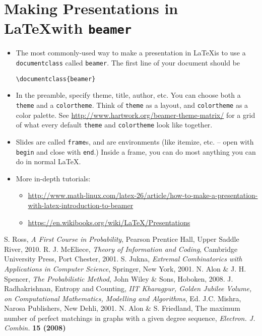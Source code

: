 \documentclass{article}
\begin{document}
	\section{Making Presentations in \LaTeX with \texttt{beamer}}
	\begin{itemize}
		\item The most commonly-used way to make a presentation in \LaTeX is to use a \texttt{documentclass} called \texttt{beamer}. The first line of your document should be
		\begin{verbatim}
\documentclass{beamer}
		\end{verbatim}
		\item In the preamble, specify theme, title, author, etc. You can choose both a \texttt{theme} and a \texttt{colortheme}. Think of \texttt{theme} as a layout, and \texttt{colortheme} as a color palette. See \href{http://www.hartwork.org/beamer-theme-matrix/}{http://www.hartwork.org/beamer-theme-matrix/} for a grid of what every default \texttt{theme} and \texttt{colortheme} look like together.
		\item Slides are called \texttt{frame}s, and are environments (like itemize, etc. -- open with \texttt{begin} and close with \texttt{end}.) Inside a frame, you can do most anything you can do in normal \LaTeX.
		\item More in-depth tutorials:
		\begin{itemize}
			\item \href{http://www.math-linux.com/latex-26/article/how-to-make-a-presentation-with-latex-introduction-to-beamer}{http://www.math-linux.com/latex-26/article/how-to-make-a-presentation-with-latex-introduction-to-beamer}
			\item \href{https://en.wikibooks.org/wiki/LaTeX/Presentations}{https://en.wikibooks.org/wiki/LaTeX/Presentations}
		\end{itemize}
	\end{itemize}
	
\begin{thebibliography}{99}
S. Ross, \textit{A First Course in Probability}, Pearson Prentice Hall, Upper Saddle River, 2010.
R. J. McEliece, \textit{Theory of Information and Coding}, Cambridge University Press, Port Chester, 2001.
S. Jukna, \textit{Extremal Combinatorics with Applications in Computer Science}, Springer, New York, 2001.
N. Alon \& J. H. Spencer, \textit{The Probabilistic Method}, John Wiley \& Sons, Hoboken, 2008.
J. Radhakrishnan, Entropy and Counting, \textit{IIT Kharagpur, Golden Jubilee Volume, on Computational Mathematics, Modelling and Algorithms}, Ed. J.C. Mishra, Narosa Publishers, New Dehli, 2001.
N. Alon \& S. Friedland, The maximum number of perfect matchings in graphs with a given degree sequence, \emph{Electron. J. Combin.} \bf{15} (2008)
\end{thebibliography}

	
\end{document}
